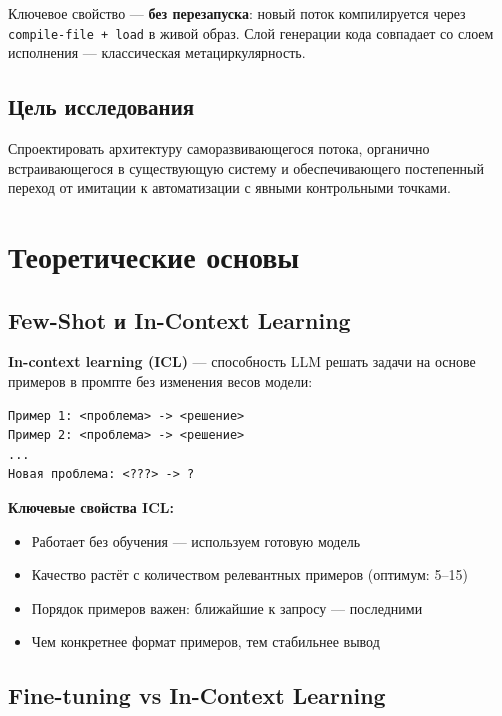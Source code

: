 \documentclass[12pt, a4paper, twoside]{article}
\begin{document}
Ключевое свойство --- \textbf{без перезапуска}: новый поток компилируется через
\texttt{compile-file + load} в живой образ. Слой генерации кода совпадает со слоем
исполнения --- классическая метациркулярность.

\subsection{Цель исследования}

Спроектировать архитектуру саморазвивающегося потока, органично
встраивающегося в существующую систему и обеспечивающего постепенный
переход от имитации к автоматизации с явными контрольными точками.

\section{Теоретические основы}

\subsection{Few-Shot и In-Context Learning}

\textbf{In-context learning (ICL)} --- способность LLM решать задачи на
основе примеров в промпте без изменения весов модели:

\begin{lstlisting}[language={},caption={Структура ICL-промпта}]
Пример 1: <проблема> -> <решение>
Пример 2: <проблема> -> <решение>
...
Новая проблема: <???> -> ?
\end{lstlisting}

\textbf{Ключевые свойства ICL:}
\begin{itemize}[leftmargin=1.5em]
  \item Работает без обучения --- используем готовую модель
  \item Качество растёт с количеством релевантных примеров (оптимум: 5--15)
  \item Порядок примеров важен: ближайшие к запросу --- последними
  \item Чем конкретнее формат примеров, тем стабильнее вывод
\end{itemize}

\subsection{Fine-tuning vs In-Context Learning}
\end{document}
